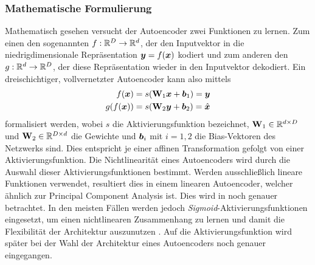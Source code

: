 \subsubsection{Mathematische Formulierung}
\label{ch:MethodenDerDimRed:ML:AE:MathematischeFormulierung}
Mathematisch gesehen versucht der Autoencoder zwei Funktionen zu lernen. Zum einen den sogenannten  $f: \mathbb{R}^D \rightarrow \mathbb{R}^d$, der den Inputvektor in die niedrigdimensionale Repräsentation $\bm{y} = f(\bm{x})$ kodiert und zum anderen den  $g: \mathbb{R}^d \rightarrow \mathbb{R}^D$, der diese Repräsentation wieder in den Inputvektor dekodiert. Ein dreischichtiger, vollvernetzter Autoencoder kann also mittels
\begin{align}
	\label{eq:dreischichtigerAE}
	f(\bm{x})    & = s(\mathbf{W}_1 \bm{x} + \bm{b}_1) = \bm{y}             \\
	g(f(\bm{x})) & = s(\mathbf{W}_2 \bm{y} + \bm{b}_2) = \hat{\bm{x}}
\end{align}
formalisiert werden, wobei $s$ die Aktivierungsfunktion bezeichnet, $\mathbf{W}_1 \in \mathbb{R}^{d \times D}$ und $\mathbf{W}_2 \in \mathbb{R}^{D \times d}$ die Gewichte und $\bm{b}_i$ mit $i = 1,2$ die Bias-Vektoren des Netzwerks sind. Dies entspricht je einer affinen Transformation gefolgt von einer Aktivierungsfunktion. Die Nichtlinearität eines Autoencoders wird durch die Auswahl dieser Aktivierungsfunktionen bestimmt.
Werden ausschließlich lineare Funktionen verwendet, resultiert dies in einem linearen Autoencoder,
welcher ähnlich zur Principal Component Analysis ist. Dies wird in
 noch genauer betrachtet. In den meisten Fällen werden
jedoch \textit{Sigmoid}-Aktivierungsfunktionen eingesetzt, um einen nichtlinearen Zusammenhang zu
lernen und damit die Flexibilität der Architektur auszunutzen \parencite[4]{Charte.2018}. Auf die Aktivierungsfunktion wird später bei der Wahl der Architektur eines
Autoencoders noch genauer eingegangen.

